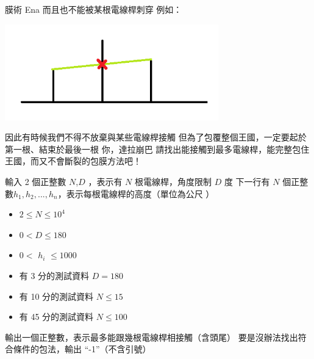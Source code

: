 \begin{problem}{膜術 Ena}
而且也不能被某根電線桿刺穿\newline
例如：\newline

\centerline{\includegraphics[width=25em]{./pics/D-3.png}}

因此有時候我們不得不放棄與某些電線桿接觸\newline
但為了包覆整個王國，一定要起於第一根、結束於最後一根\newline
\newline
\newline
你，達拉崩巴\newline
請找出能接觸到最多電線桿，能完整包住王國，而又不會斷裂的包膜方法吧！\newline

\InputFile

輸入 2 個正整數 $N$,$D$ ，表示有 $N$ 根電線桿，角度限制 $D$ 度 \newline
下一行有 $N$ 個正整數$h_1,h_2,...,h_n$，表示每根電線桿的高度（單位為公尺 ）\newline

\begin{iofmt}
\begin{itemize}
	\item $2 \leq N \leq 10^4$
    \item $0 < D \leq 180$
    \item $0 <$ $h_i$ $\leq 1000 $
    \item 有 3 分的測試資料 $ D = 180 $
	\item 有 10 分的測試資料 $N \leq 15$
	\item 有 45 分的測試資料 $N \leq 100$
\end{itemize}
\end{iofmt}

\OutputFile

輸出一個正整數，表示最多能跟幾根電線桿相接觸（含頭尾）\newline
要是沒辦法找出符合條件的包法，輸出 ``-1''（不含引號）\newline


\end{problem}
